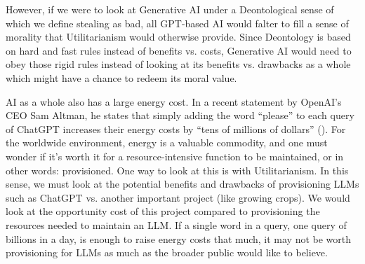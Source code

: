 \documentclass[letterpaper,11pt,leqno]{article}
\begin{document}
However, if we were to look at Generative AI under a Deontological sense of which we define stealing as bad, all GPT-based AI would falter to fill a sense of morality that Utilitarianism would otherwise provide. Since Deontology is based on hard and fast rules instead of benefits vs. costs, Generative AI would need to obey those rigid rules instead of looking at its benefits vs. drawbacks as a whole which might have a chance to redeem its moral value.

AI as a whole also has a large energy cost. In a recent statement by OpenAI's CEO Sam Altman, he states that simply adding the word ``please'' to each query of ChatGPT increases their energy costs by ``tens of millions of dollars'' (\cite{AltmanTweet}). For the worldwide environment, energy is a valuable commodity, and one must wonder if it's worth it for a resource-intensive function to be maintained, or in other words: provisioned. One way to look at this is with Utilitarianism. In this sense, we must look at the potential benefits and drawbacks of provisioning LLMs such as ChatGPT vs. another important project (like growing crops). We would look at the opportunity cost of this project compared to provisioning the resources needed to maintain an LLM. If a single word in a query, one query of billions in a day, is enough to raise energy costs that much, it may not be worth provisioning for LLMs as much as the broader public would like to believe.

\pagebreak

\printbibliography
\end{document}
